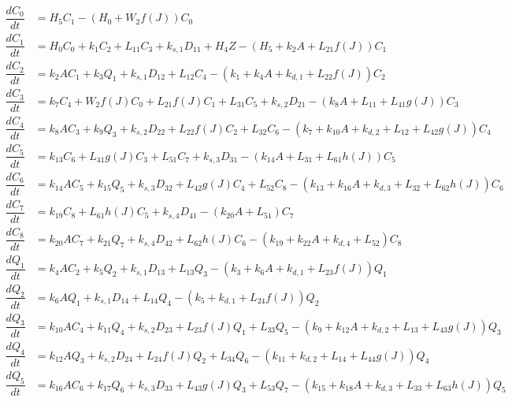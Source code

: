 \begin{align*}
\dfrac{dC_{0}}{dt} & =H_{5}C_{1}-\left(H_{0}+W_{2}f\left(J\right)\right)C_{0}\\
\dfrac{dC_{1}}{dt} & =H_{0}C_{0}+k_{1}C_{2}+L_{11}C_{3}+k_{s,1}D_{11}+H_{4}Z-\left(H_{5}+k_{2}A+L_{21}f\left(J\right)\right)C_{1}\\
\dfrac{dC_{2}}{dt} & =k_{2}AC_{1}+k_{3}Q_{1}+k_{s,1}D_{12}+L_{12}C_{4}-\left(k_{1}+k_{4}A+k_{d,1}+L_{22}f\left(J\right)\right)C_{2}\\
\dfrac{dC_{3}}{dt} & =k_{7}C_{4}+W_{2}f\left(J\right)C_{0}+L_{21}f\left(J\right)C_{1}+L_{31}C_{5}+k_{s,2}D_{21}-\left(k_{8}A+L_{11}+L_{41}g\left(J\right)\right)C_{3}\\
\dfrac{dC_{4}}{dt} & =k_{8}AC_{3}+k_{9}Q_{3}+k_{s,2}D_{22}+L_{22}f\left(J\right)C_{2}+L_{32}C_{6}-\left(k_{7}+k_{10}A+k_{d,2}+L_{12}+L_{42}g\left(J\right)\right)C_{4}\\
\dfrac{dC_{5}}{dt} & =k_{13}C_{6}+L_{41}g\left(J\right)C_{3}+L_{51}C_{7}+k_{s,3}D_{31}-\left(k_{14}A+L_{31}+L_{61}h\left(J\right)\right)C_{5}\\
\dfrac{dC_{6}}{dt} & =k_{14}AC_{5}+k_{15}Q_{5}+k_{s,3}D_{32}+L_{42}g\left(J\right)C_{4}+L_{52}C_{8}-\left(k_{13}+k_{16}A+k_{d,3}+L_{32}+L_{62}h\left(J\right)\right)C_{6}\\
\dfrac{dC_{7}}{dt} & =k_{19}C_{8}+L_{61}h\left(J\right)C_{5}+k_{s,4}D_{41}-\left(k_{20}A+L_{51}\right)C_{7}\\
\dfrac{dC_{8}}{dt} & =k_{20}AC_{7}+k_{21}Q_{7}+k_{s,4}D_{42}+L_{62}h\left(J\right)C_{6}-\left(k_{19}+k_{22}A+k_{d,4}+L_{52}\right)C_{8}\\
\dfrac{dQ_{1}}{dt} & =k_{4}AC_{2}+k_{5}Q_{2}+k_{s,1}D_{13}+L_{13}Q_{3}-\left(k_{3}+k_{6}A+k_{d,1}+L_{23}f\left(J\right)\right)Q_{1}\\
\dfrac{dQ_{2}}{dt} & =k_{6}AQ_{1}+k_{s,1}D_{14}+L_{14}Q_{4}-\left(k_{5}+k_{d,1}+L_{24}f\left(J\right)\right)Q_{2}\\
\dfrac{dQ_{3}}{dt} & =k_{10}AC_{4}+k_{11}Q_{4}+k_{s,2}D_{23}+L_{23}f\left(J\right)Q_{1}+L_{33}Q_{5}-\left(k_{9}+k_{12}A+k_{d,2}+L_{13}+L_{43}g\left(J\right)\right)Q_{3}\\
\dfrac{dQ_{4}}{dt} & =k_{12}AQ_{3}+k_{s,2}D_{24}+L_{24}f\left(J\right)Q_{2}+L_{34}Q_{6}-\left(k_{11}+k_{d,2}+L_{14}+L_{44}g\left(J\right)\right)Q_{4}\\
\dfrac{dQ_{5}}{dt} & =k_{16}AC_{6}+k_{17}Q_{6}+k_{s,3}D_{33}+L_{43}g\left(J\right)Q_{3}+L_{53}Q_{7}-\left(k_{15}+k_{18}A+k_{d,3}+L_{33}+L_{63}h\left(J\right)\right)Q_{5}\\

\end{align*}
